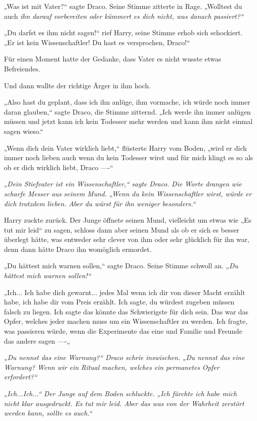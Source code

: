 {„Was ist mit Vater?“ sagte Draco. Seine Stimme zitterte in Rage. „Wolltest du auch \emph{ihn darauf vorbereiten oder kümmert es dich nicht, was danach passiert?“}

„Du darfst es ihm nicht sagen!“ rief Harry, seine Stimme erhob sich schockiert. „Er ist kein Wissenschaftler! Du hast es versprochen, Draco!“

Für einen Moment hatte der Gedanke, dass Vater es nicht wusste etwas Befreiendes.

Und dann wallte der richtige Ärger in ihm hoch.

„Also hast du geplant, dass ich ihn anlüge, ihm vormache, ich würde noch immer daran glauben,“ sagte Draco, die Stimme zitternd. „Ich werde ihn immer anlügen müssen und jetzt kann ich kein Todesser mehr werden und kann ihm nicht einmal sagen wieso.“

„Wenn dich dein Vater wirklich liebt,“ flüsterte Harry vom Boden, „wird er dich immer noch lieben auch wenn du kein Todesser wirst und für mich klingt es so als ob er dich wirklich liebt, Draco ----“

„\emph{Dein Stiefvater ist ein Wissenschaftler,“ sagte Draco. Die Worte drangen wie scharfe Messer aus seinem Mund. „Wenn \emph{du} kein Wissenschaftler wirst, würde er dich trotzdem lieben. Aber du wärst für ihn weniger besonders.“}

Harry zuckte zurück. Der Junge öffnete seinen Mund, vielleicht um etwas wie „Es tut mir leid“ zu sagen, schloss dann aber seinen Mund als ob er sich es besser überlegt hätte, was entweder sehr clever von ihm oder sehr glücklich für ihn war, denn dann hätte Draco ihn womöglich ermordet.

„Du hättest mich warnen sollen,“ sagte Draco. Seine Stimme schwoll an. „\emph{Du hättest mich warnen sollen!“}

„Ich... Ich habe dich gewarnt... jedes Mal wenn ich dir von dieser Macht erzählt habe, ich habe dir vom Preis erzählt. Ich sagte, du würdest zugeben müssen falsch zu liegen. Ich sagte das könnte das Schwierigste für dich sein. Das war das Opfer, welches jeder machen muss um ein Wissenschaftler zu werden. Ich fragte, was passieren würde, wenn die Experimente das eine und Familie und Freunde das andere sagen ----„

\emph{„\emph{Du nennst das eine Warnung?“} Draco schrie inswischen. \emph{„Du nennst das eine Warnung? Wenn wir ein Ritual machen, welches ein permanetes Opfer erfordert?“}}

\emph{„Ich...Ich...“ Der Junge auf dem Boden schluckte. „Ich fürchte ich habe mich nicht klar ausgedruckt. Es tut mir leid. Aber das was von der Wahrheit zerstört werden kann, sollte es auch.“}

}
